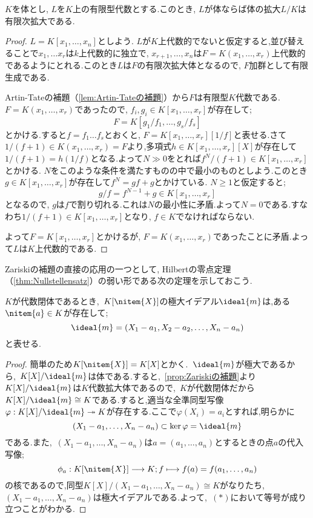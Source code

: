 \begin{prop}[Zariskiの補題]\label{prop:Zariskiの補題}
	$K$を体とし, $L$を$K$上の有限型代数とする.このとき, $L$が体ならば体の拡大$L/K$は有限次拡大である. 
\end{prop}

\begin{proof}
	$L=K[x_1,\dots,x_n]$としよう. $L$が$K$上代数的でないと仮定すると,並び替えることで$x_1,\dots x_r$は$k$上代数的に独立で, $x_{r+1},\dots,x_n$は$F=K(x_1,\dots,x_r)$上代数的であるようにとれる.このとき$L$は$F$の有限次拡大体となるので, $F$加群として有限生成である.
	
	Artin-Tateの補題（\ref{lem:Artin-Tateの補題}）から$F$は有限型$K$代数である. $F=K(x_1,\dots,x_r)$であったので, $f_i,g_i\in K[x_1,\dots,x_r]$が存在して;
	\[F=K[g_1/f_1,\dots,g_s/f_s]\]
	とかける.すると$f=f_1\dots f_s$とおくと, $F=K[x_1,\dots,x_r][1/f]$と表せる.さて$1/(f+1)\in K(x_1,\dots,x_r)=F$より,多項式$h\in K[x_1,\dots,x_r][X]$が存在して$1/(f+1)=h(1/f)$となる.よって$N\gg0$をとれば$f^N/(f+1)\in K[x_1,\dots,x_r]$とかける. $N$をこのような条件を満たすものの中で最小のものとしよう.このとき$g\in K[x_1,\dots,x_r]$が存在して$f^N=gf+g$とかけている. $N\geq1$と仮定すると;
	\[g/f=f^{N-1}+g\in K[x_1,\dots,x_r]\]
	となるので, $g$は$f$で割り切れる.これは$N$の最小性に矛盾.よって$N=0$である.すなわち$1/(f+1)\in K[x_1,\dots,x_r]$となり, $f\in K$でなければならない.
	
	よって$F=K[x_1,\dots,x_r]$とかけるが, $F=K(x_1,\dots,x_r)$であったことに矛盾.よって$L$は$K$上代数的である.
\end{proof}

Zariskiの補題の直接の応用の一つとして, Hilbertの零点定理（\ref{thm:Nullstellensatz}）の弱い形である次の定理を示しておこう.

\begin{thm}\label{thm:week nullstellensatz}
	$K$が代数閉体であるとき,~$K[\nitem{X}]$の極大イデアル$\ideal{m}$は,ある$\nitem{a}\in K$が存在して;
	\[\ideal{m}=(X_1-a_1,X_2-a_2,\dots,X_n-a_n)\]
	と表せる.
\end{thm}
\begin{proof}
	簡単のため$K[\nitem{X}]=K[X]$とかく.~$\ideal{m}$が極大であるから,~$K[X]/\ideal{m}$は体である.すると,~\ref{prop:Zariskiの補題}より$K[X]/\ideal{m}$は$K$代数拡大体であるので,~$K$が代数閉体だから$K[X]/\ideal{m}\cong K$である.すると,適当な全準同型写像$\varphi:K[X]/\ideal{m}\twoheadrightarrow K$が存在する.ここで$\varphi(X_i)=a_i$とすれば,明らかに\displaystar
	\[(X_1-a_1,\dots,X_n-a_n)\subset\ker\varphi=\ideal{m}\]
	である.また,~$(X_1-a_1,\dots,X_n-a_n)$は$a=(a_1,\dots,a_n)$とするときの点$a$の代入写像;
	\[\phi_a:K[\nitem{X}]\longrightarrow K;f\longmapsto f(a)=f(a_1,\dots,a_n)\]
	の核であるので,同型$K[X]/(X_1-a_1,\dots,X_n-a_n)\cong K$がなりたち,~$(X_1-a_1,\dots,X_n-a_n)$は極大イデアルである.よって,~$(\ast)$において等号が成り立つことがわかる.
\end{proof}
